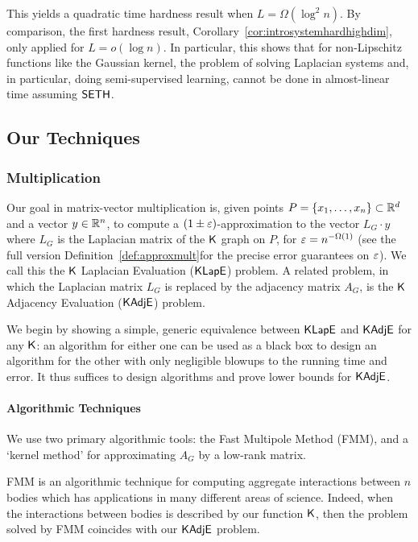 This yields a quadratic time hardness result when $L = \Omega(\log^2 n)$. By comparison, the first hardness result, Corollary~\ref{cor:introsystemhardhighdim}, only applied for $L = o(\log n)$. In particular, this shows that for non-Lipschitz functions like the Gaussian kernel, the problem of solving Laplacian systems and, in particular, doing semi-supervised learning, cannot be done in almost-linear time assuming $\mathsf{SETH}$.





\subsection{Our Techniques}

\subsubsection{Multiplication}

Our goal in matrix-vector multiplication is, given points $P = \{ x_1, \ldots, x_n\} \subset {\mathbb R}^d$ and a vector $y \in {\mathbb R}^n$, to compute a $(1 \pm \varepsilon)$-approximation to the vector $L_G \cdot y$ where $L_G$ is the Laplacian matrix of the $\mathsf{K}$ graph on $P$, for $\varepsilon = n^{-\Omega(1)}$ (see
\ifdefined\isfocs
the full version
\else
Definition~\ref{def:approxmult}\fi for the precise error guarantees on $\varepsilon$). We call this the $\mathsf{K}$ Laplacian Evaluation ($\mathsf{KLapE}$) problem. A related problem, in which the Laplacian matrix $L_G$ is replaced by the adjacency matrix $A_G$, is the $\mathsf{K}$ Adjacency Evaluation ($\mathsf{KAdjE}$) problem.

We begin by showing a simple, generic equivalence between $\mathsf{KLapE}$ and $\mathsf{KAdjE}$ for any $\mathsf{K}$: an algorithm for either one can be used as a black box to design an algorithm for the other with only negligible blowups to the running time and error. It thus suffices to design algorithms and prove lower bounds for $\mathsf{KAdjE}$.

\paragraph*{Algorithmic Techniques}

We use two primary algorithmic tools: the Fast Multipole Method (FMM), and a `kernel method' for approximating $A_G$ by a low-rank matrix.

FMM is an algorithmic technique for computing aggregate interactions between $n$ bodies which has applications in many different areas of science. Indeed, when the interactions between bodies is described by our function $\mathsf{K}$, then the problem solved by FMM coincides with our $\mathsf{KAdjE}$ problem. 

